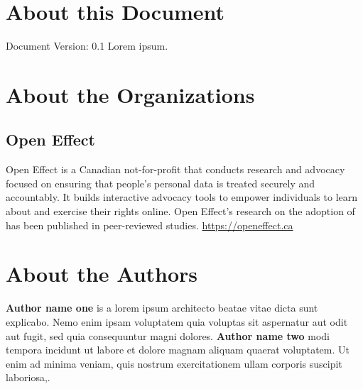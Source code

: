 \documentclass[12pt]{article}
\begin{document}
\begin{spacing}{1}
\pagebreak

\section*{About this Document}
\label{sec:doc}
Document Version: 0.1
\hfill \break
\hfill \break
Lorem ipsum.


\pagebreak

\section*{About the Organizations}
\label{sec:about}
\subsection*{Open Effect}
Open Effect is a Canadian not-for-profit that conducts research and advocacy focused on ensuring that people’s personal data is treated securely and accountably. It builds interactive advocacy tools to empower individuals to learn about and exercise their rights online. Open Effect's research on the adoption of  has been published in peer-reviewed studies.
\hfill \break
\hfill \break
\url{https://openeffect.ca}


\section*{About the Authors}
\textbf{Author name one} is a lorem ipsum architecto beatae vitae dicta sunt explicabo. Nemo enim ipsam voluptatem quia voluptas sit aspernatur aut odit aut fugit, sed quia consequuntur magni dolores.
\hfill \break
\hfill \break
\noindent
\textbf{Author name two} modi tempora incidunt ut labore et dolore magnam aliquam quaerat voluptatem. Ut enim ad minima veniam, quis nostrum exercitationem ullam corporis suscipit laboriosa,.

\end{spacing}
\end{document}
